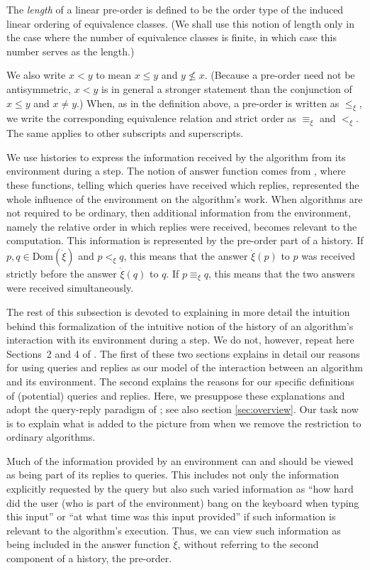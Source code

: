 \documentclass{LMCS}
\theoremstyle{definition}
\newcommand{\ans}{\dot}
\newcommand{\dom}[1]{\ensuremath{{\text{Dom}}(#1)}}
\begin{document}
The \emph{length} of a linear pre-order is defined to be the order
type of the induced linear ordering of equivalence classes.  (We shall
use this notion of length only in the case where the number of
equivalence classes is finite, in which case this number serves as the
length.)

We also write $x<y$ to mean $x\leq y$ and $y\not\leq x$.  (Because a
pre-order need not be antisymmetric, $x<y$ is in general a stronger
statement than the conjunction of $x\leq y$ and $x\neq y$.)  When, as
in the definition above, a pre-order is written as $\leq_\xi$, we
write the corresponding equivalence relation and strict order as
$\equiv_\xi$ and $<_\xi$.  The same applies to other subscripts and
superscripts.

We use histories to express the information received by the algorithm
from its environment during a step.  The notion of answer function
comes from \cite{oa1}, where these functions, telling which queries
have received which replies, represented the whole influence of the
environment on the algorithm's work.  When algorithms are not required
to be ordinary, then additional information from the environment,
namely the relative order in which replies were received, becomes
relevant to the computation.  This information is represented by the
pre-order part of a history.  If $p,q\in\dom{\ans\xi}$ and $p<_\xi q$, this
means that the answer ${\ans\xi}(p)$ to $p$ was received strictly
before the answer ${\ans\xi}(q)$ to $q$.  If $p\equiv_\xi q$, this
means that the two answers were received simultaneously.

The rest of this subsection is devoted to explaining in more detail
the intuition behind this formalization of the intuitive notion of
the history of an algorithm's interaction with its environment
during a step.  We do not, however, repeat here Sections~2 and 4 of
\cite{oa1}. The first of these two sections explains in detail our
reasons for using queries and replies as our model of the
interaction between an algorithm and its environment.  The second
explains the reasons for our specific definitions of (potential)
queries and replies.  Here, we presuppose these explanations and
adopt the query-reply paradigm of \cite{oa1}; see also section
\ref{sec:overview}. Our task now is to explain what is added to the
picture from \cite{oa1} when we remove the restriction to ordinary
algorithms.

Much of the information provided by an environment can and should be
viewed as being part of its replies to queries.  This includes not
only the information explicitly requested by the query but also such
varied information as ``how hard did the user (who is part of the
environment) bang on the keyboard when typing this input'' or ``at
what time was this input provided'' if such information is relevant to
the algorithm's execution.  Thus, we can view such information as being
included in the answer function ${\ans\xi}$, without referring to the second
component of a history, the pre-order.
\end{document}

